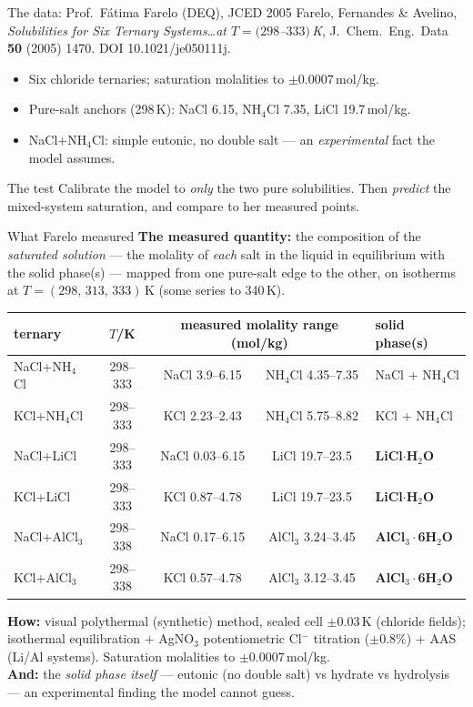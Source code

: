 \documentclass[aspectratio=169,11pt]{beamer}
\begin{document}
\begin{frame}{The data: Prof.\ F\'atima Farelo (DEQ), JCED 2005}
\footnotesize Farelo, Fernandes \& Avelino, \emph{Solubilities for Six Ternary
Systems\ldots at $T=(298$--$333)$\,K}, J.\ Chem.\ Eng.\ Data \textbf{50} (2005)
1470. DOI 10.1021/je050111j.
\vspace{0.4em}
\begin{itemize}\small
  \item Six chloride ternaries; saturation molalities to $\pm0.0007$\,mol/kg.
  \item Pure-salt anchors (298\,K): NaCl 6.15, NH$_4$Cl 7.35, LiCl 19.7\,mol/kg.
  \item NaCl+NH$_4$Cl: simple eutonic, no double salt --- an \emph{experimental}
        fact the model assumes.
\end{itemize}
\begin{alertblock}{The test}
Calibrate the model to \emph{only} the two pure solubilities. Then \emph{predict}
the mixed-system saturation, and compare to her measured points.
\end{alertblock}
\end{frame}

\begin{frame}{What Farelo measured}
\textbf{The measured quantity:} the composition of the \emph{saturated solution} ---
the molality of \emph{each} salt in the liquid in equilibrium with the solid
phase(s) --- mapped from one pure-salt edge to the other, on isotherms at
$T=(298,\,313,\,333)$\,K (some series to 340\,K).
\vspace{0.3em}
\centering\scriptsize
\begin{tabular}{lcccl}
\toprule
ternary & $T$/K & \multicolumn{2}{c}{measured molality range (mol/kg)} & solid phase(s) \\
\midrule
NaCl+NH$_4$Cl & 298--333 & NaCl 3.9--6.15 & NH$_4$Cl 4.35--7.35 & NaCl + NH$_4$Cl \\
KCl+NH$_4$Cl  & 298--333 & KCl 2.23--2.43 & NH$_4$Cl 5.75--8.82 & KCl + NH$_4$Cl \\
NaCl+LiCl     & 298--333 & NaCl 0.03--6.15 & LiCl 19.7--23.5 & \textbf{LiCl$\cdot$H$_2$O} \\
KCl+LiCl      & 298--333 & KCl 0.87--4.78 & LiCl 19.7--23.5 & \textbf{LiCl$\cdot$H$_2$O} \\
NaCl+AlCl$_3$ & 298--338 & NaCl 0.17--6.15 & AlCl$_3$ 3.24--3.45 & \textbf{AlCl$_3\cdot$6H$_2$O} \\
KCl+AlCl$_3$  & 298--338 & KCl 0.57--4.78 & AlCl$_3$ 3.12--3.45 & \textbf{AlCl$_3\cdot$6H$_2$O} \\
\bottomrule
\end{tabular}
\vspace{0.4em}
\flushleft\footnotesize
\textbf{How:} visual polythermal (synthetic) method, sealed cell $\pm0.03$\,K
(chloride fields); isothermal equilibration $+$ AgNO$_3$ potentiometric Cl$^-$
titration ($\pm0.8\%$) $+$ AAS (Li/Al systems). Saturation molalities to
$\pm0.0007$\,mol/kg. \\
\textbf{And:} the \emph{solid phase itself} --- eutonic (no double salt) vs
hydrate vs hydrolysis --- an experimental finding the model cannot guess.
\end{frame}
\end{document}
